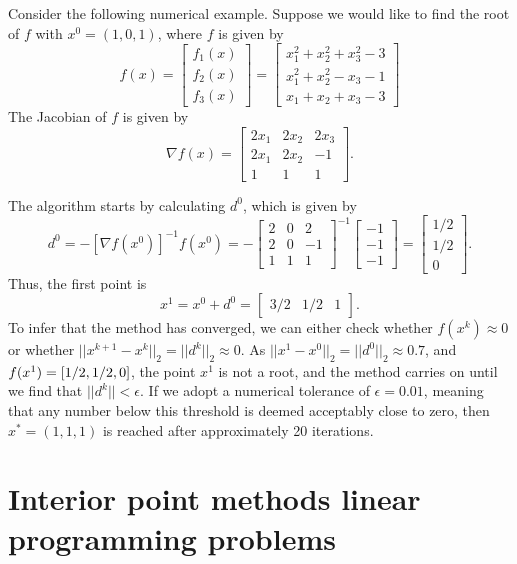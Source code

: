 Consider the following numerical example. Suppose we would like to find the root of $f$ with $x^0 = (1,0,1)$, where $f$ is given by 
	$$
	f(x) = \begin{bmatrix}f_1(x) \\ f_2(x) \\ f_3(x) \end{bmatrix} = \begin{bmatrix} x_1^2 + x_2^2 + x_3^2 -3 \\ x_1^2 + x_2^2 - x_3 - 1 \\ x_1 + x_2 + x_3 - 3 \end{bmatrix}
	$$
	The Jacobian of $f$ is given by 
	$$
	\nabla f(x)=\begin{bmatrix} 2x_1 & 2x_2 & 2x_3 \\ 2x_1 & 2x_2 & -1 \\ 1 & 1 & 1\end{bmatrix}.
	$$
	
	The algorithm starts by calculating $d^0$, which is given by
	$$
	d^0 = -[\nabla f(x^0)]^{-1}f(x^0) = - \begin{bmatrix} 2 & 0 & 2 \\ 2 & 0 & -1 \\ 1 & 1 & 1\end{bmatrix}^{-1}\begin{bmatrix} -1 \\ -1 \\ -1 \end{bmatrix} = \begin{bmatrix} 1/2 \\ 1/2 \\ 0 \end{bmatrix}.
	$$ 
	Thus, the first point is 
	$$
	x^1 = x^0 + d^0 = \begin{bmatrix} 3/2 & 1/2 & 1\end{bmatrix}.
	$$ 
	To infer that the method has converged, we can either check whether $f(x^k) \approx 0$ or whether $||x^{k+1} - x^{k}||_2 = || d^{k} ||_2 \approx 0$. As $||x^1 - x^0||_2 = || d^0 ||_2 \approx 0.7$, and $f(x^1) = \left[ 1/2, 1/2, 0 \right]$, the point $x^1$ is not a root, and the method carries on until we find that $|| d^k|| < \epsilon$. If we adopt a numerical tolerance of $\epsilon = 0.01$, meaning that any number below this threshold is deemed acceptably close to zero, then $x^* = (1, 1, 1)$ is reached after approximately 20 iterations.	

\section{Interior point methods linear programming problems}
	
